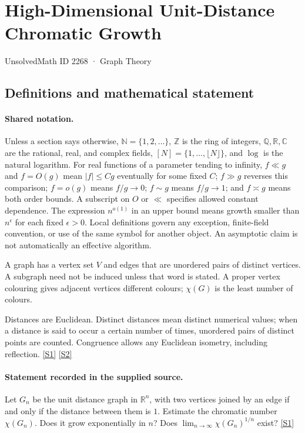 \documentclass[11pt,a4paper]{article}
\newcommand{\N}{\mathbb{N}}
\newcommand{\Z}{\mathbb{Z}}
\newcommand{\Q}{\mathbb{Q}}
\newcommand{\R}{\mathbb{R}}
\newcommand{\C}{\mathbb{C}}
\newcommand{\sref}[2]{\hyperlink{source:#1:#2}{[S#2]}}
\begin{document}

\setcounter{section}{2267}

\section{High-Dimensional Unit-Distance Chromatic Growth}\label{2268}

{\small\sffamily UnsolvedMath ID 2268 · Graph Theory}

\subsection{Definitions and mathematical statement}

\paragraph{Shared notation.}Unless a section says otherwise, $\N=\{1,2,\ldots\}$,
$\Z$ is the ring of integers, $\Q,\R,\C$ are the rational, real, and complex
fields, $[N]=\{1,\ldots,\lfloor N\rfloor\}$, and $\log$ is the natural
logarithm. For real functions of a parameter tending to infinity,
$f\ll g$ and $f=O(g)$ mean $|f|\leq Cg$ eventually for some fixed $C$;
$f\gg g$ reverses this comparison; $f=o(g)$ means $f/g\to0$;
$f\sim g$ means $f/g\to1$; and $f\asymp g$ means both order bounds.
A subscript on $O$ or $\ll$ specifies allowed constant dependence.
The expression $n^{o(1)}$ in an upper bound means growth smaller than
$n^\epsilon$ for each fixed $\epsilon>0$. Local definitions govern any
exception, finite-field convention, or use of the same symbol for another
object. An asymptotic claim is not automatically an effective algorithm.



A graph has a vertex set $V$ and edges that are unordered pairs of distinct vertices. A subgraph need not be induced unless that word is stated. A proper vertex colouring gives adjacent vertices different colours; $\chi(G)$ is the least number of colours.

Distances are Euclidean. Distinct distances mean distinct numerical values; when a distance is said to occur a certain number of times, unordered pairs of distinct points are counted. Congruence allows any Euclidean isometry, including reflection. \sref{2268}{1} \sref{2268}{2}

\paragraph{Statement recorded in the supplied source.}
Let $G_n$ be the unit distance graph in $\mathbb{R}^n$, with two vertices joined by an edge if and only if the distance between them is $1$.
Estimate the chromatic number $\chi(G_n)$. Does it grow exponentially in $n$? Does $ \lim_{n\to \infty}\chi(G_n)^{1/n} $ exist? \sref{2268}{1}
\end{document}
